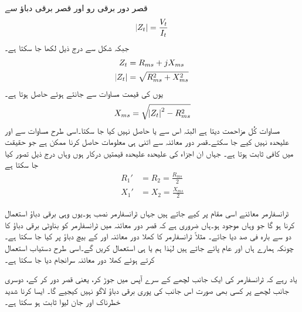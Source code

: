 قصر دور برقی رو اور قصر برقی دباؤ سے 
\begin{align*}
\abs{Z_t}=\frac{V_t}{I_t}
\end{align*}
جبکہ  شکل  سے  درج ذیل لکھا جا سکتا ہے۔
\begin{align*}
Z_t&=R_{ms}+j X_{ms}\\
\abs{Z_t}&=\sqrt{R_{ms}^2+X_{ms}^2}
\end{align*}
یوں  کی قیمت مساوات  سے  جانتے ہوئے  حاصل ہوتا ہے۔
\begin{align}\label{مساوات_ٹرانسفارمر_کسر_دور_امالہ_حاصل}
X_{ms}=\sqrt{\abs{Z_t}^2-R_{ms}^2}
\end{align}
مساوات  کُل مزاحمت دیتا ہے البتہ اس سے  یا  حاصل نہیں کیا جا سکتا۔اسی طرح مساوات  سے  اور  علیحدہ نہیں کیے جا سکتے۔قصر دور معائنہ سے اتنی ہی معلومات حاصل کرنا ممکن ہے جو حقیقت  میں کافی ثابت ہوتا ہے۔ جہاں ان اجزاء کی علیحدہ علیحدہ قیمتیں درکار ہوں وہاں درج ذیل تصور کیا جا سکتا ہے
\begin{align*}
R_1'&=R_2=\frac{R_{ms}}{2}\\
X_1'&=X_2=\frac{X_{ms}}{2}
\end{align*}


ٹرانسفارمر معائنے  اسی مقام پر کیے جاتے ہیں جہاں ٹرانسفارمر نصب ہو۔یوں وہی  برقی دباؤ استعمال کرنا ہو گا جو وہاں موجود ہو۔ہاں  ضروری ہے کہ  قصر دور معائنہ میں  ٹرانسفارمر کو   بناوٹی   برقی دباؤ کا دو سے بارہ  فی صد دیا جائے۔ مثلاً   ٹرانسفارمر کا کھلا دور معائنہ   اور   کے بیچ  دباؤ پر کیا جا سکتا ہے۔ چونکہ ہمارے ہاں   اور   عام پائے جاتے ہیں لہٰذا ہم   یا   ہی استعمال کریں گے۔اسی طرح دستیاب  استعمال کرتے ہوئے کھلا دور معائنہ سرانجام دیا جا سکتا ہے۔

یاد رہے کہ ٹرانسفارمر کی ایک جانب لچھے کے سرے آپس میں جوڑ کر، یعنی  قصر دور کر کے، دوسری جانب لچھے پر کسی بھی صورت اس جانب کی پوری برقی دباؤ لاگو نہیں کیجیے گا۔ ایسا کرنا  شدید  خطرناک اور جان لیوا ثابت ہو سکتا ہے۔

